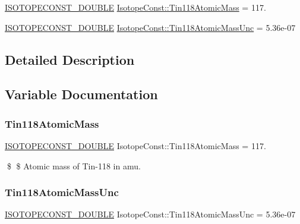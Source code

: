 \begin{DoxyCompactItemize}
\item 
\mbox{\hyperlink{group___isotope_const-_macros_ga8f45a7272ce02c0b4c65c44636ed719a}{I\+S\+O\+T\+O\+P\+E\+C\+O\+N\+S\+T\+\_\+\+D\+O\+U\+B\+LE}} \mbox{\hyperlink{group___isotope_const-_tin-_sn118_gaaa0f3bcaff74ff35afcf445f00917227}{Isotope\+Const\+::\+Tin118\+Atomic\+Mass}} = 117.
\item 
\mbox{\hyperlink{group___isotope_const-_macros_ga8f45a7272ce02c0b4c65c44636ed719a}{I\+S\+O\+T\+O\+P\+E\+C\+O\+N\+S\+T\+\_\+\+D\+O\+U\+B\+LE}} \mbox{\hyperlink{group___isotope_const-_tin-_sn118_ga4c3c33b4399ff0f3102a6f1926314897}{Isotope\+Const\+::\+Tin118\+Atomic\+Mass\+Unc}} = 5.\+36e-\/07
\end{DoxyCompactItemize}


\subsection{Detailed Description}


\subsection{Variable Documentation}
\mbox{\label{group___isotope_const-_tin-_sn118_gaaa0f3bcaff74ff35afcf445f00917227}} 
\subsubsection{\texorpdfstring{Tin118\+Atomic\+Mass}{Tin118AtomicMass}}
{\footnotesize\ttfamily \mbox{\hyperlink{group___isotope_const-_macros_ga8f45a7272ce02c0b4c65c44636ed719a}{I\+S\+O\+T\+O\+P\+E\+C\+O\+N\+S\+T\+\_\+\+D\+O\+U\+B\+LE}} Isotope\+Const\+::\+Tin118\+Atomic\+Mass = 117.}

\$ \$ Atomic mass of Tin-\/118 in amu. \mbox{\label{group___isotope_const-_tin-_sn118_ga4c3c33b4399ff0f3102a6f1926314897}} 
\subsubsection{\texorpdfstring{Tin118\+Atomic\+Mass\+Unc}{Tin118AtomicMassUnc}}
{\footnotesize\ttfamily \mbox{\hyperlink{group___isotope_const-_macros_ga8f45a7272ce02c0b4c65c44636ed719a}{I\+S\+O\+T\+O\+P\+E\+C\+O\+N\+S\+T\+\_\+\+D\+O\+U\+B\+LE}} Isotope\+Const\+::\+Tin118\+Atomic\+Mass\+Unc = 5.\+36e-\/07}

